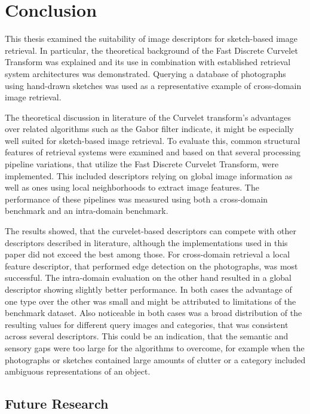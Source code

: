 \chapter{Conclusion}\label{ch:conclusion}

This thesis examined the suitability of image descriptors for sketch-based
image retrieval. In particular, the theoretical background of the Fast Discrete
Curvelet Transform was explained and its use in combination with established
retrieval system architectures was demonstrated. Querying a database of
photographs using hand-drawn sketches was used as a representative example of
cross-domain image retrieval.

The theoretical discussion in literature of the Curvelet transform's advantages
over related algorithms such as the Gabor filter indicate, it might be
especially well suited for sketch-based image retrieval. To evaluate this,
common structural features of retrieval systems were examined and based on that
several processing pipeline variations, that utilize the Fast Discrete Curvelet
Transform, were implemented. This included descriptors relying on global image
information as well as ones using local neighborhoods to extract image
features. The performance of these pipelines was measured using both a
cross-domain benchmark and an intra-domain benchmark.

The results showed, that the curvelet-based descriptors can compete with other
descriptors described in literature, although the implementations used in this
paper did not exceed the best among those. For cross-domain retrieval a local
feature descriptor, that performed edge detection on the photographs, was most
successful. The intra-domain evaluation on the other hand resulted in a global
descriptor showing slightly better performance. In both cases the advantage of
one type over the other was small and might be attributed to limitations of the
benchmark dataset. Also noticeable in both cases was a broad distribution of
the resulting values for different query images and categories, that was
consistent across several descriptors. This could be an indication, that the
semantic and sensory gaps were too large for the algorithms to overcome, for
example when the photographs or sketches contained large amounts of clutter or
a category included ambiguous representations of an object.

\section{Future Research}\label{sec:conclusion_future_research}

